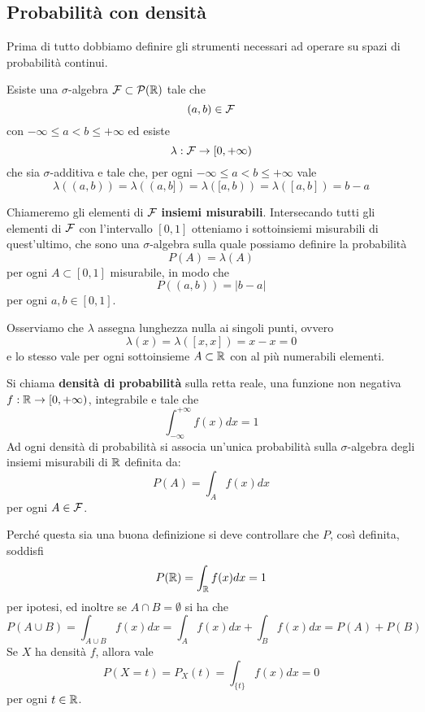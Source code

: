 \subsection{Probabilità con densità}
Prima di tutto dobbiamo definire gli strumenti necessari ad operare su spazi di probabilità
continui.

\begin{theorem}
	Esiste una $\sigma$-algebra $\mathcal{F} \subset \mathcal{P}(\mathbb{R})$ tale che
	\[ (a, b) \in \mathcal{F} \]
	con $-\infty \leq a < b \leq +\infty$ ed esiste
	\[ \lambda : \mathcal{F} \to [0, +\infty) \]
			che sia $\sigma$-additiva e tale che, per ogni $-\infty \leq a < b \leq +\infty$ vale
			\[ \lambda((a,b)) = \lambda((a,b]) = \lambda ([a,b)) = \lambda([a,b]) = b - a \]
\end{theorem}

Chiameremo gli elementi di $\mathcal{F}$ \textbf{insiemi misurabili}. Intersecando tutti gli elementi di
$\mathcal{F}$ con l'intervallo $[0,1]$ otteniamo i sottoinsiemi misurabili di quest'ultimo, che sono una
$\sigma$-algebra sulla quale possiamo definire la probabilità
\[ P (A) = \lambda (A) \]
per ogni $A \subset [0,1]$ misurabile, in modo che
\[ P((a, b)) = |b - a| \]
per ogni $a,b \in [0,1]$.

\begin{observation}
	Osserviamo che $\lambda$ assegna lunghezza nulla ai singoli punti, ovvero
	\[ \lambda(x) = \lambda([x,x]) = x - x = 0 \]
	e lo stesso vale per ogni sottoinsieme $A \subset \mathbb{R}$ con al più numerabili elementi.
\end{observation}

\begin{definition}
	Si chiama \textbf{densità di probabilità} sulla retta reale, una funzione non negativa
	$f : \mathbb{R} \to [0, +\infty)$, integrabile e tale che
	\[ \int_{-\infty}^{+\infty} f(x) dx = 1 \]
	Ad ogni densità di probabilità si associa un'unica probabilità sulla $\sigma$-algebra degli
	insiemi misurabili di $\mathbb{R}$ definita da:
	\[ P(A) = \int_A f(x) dx \]
	per ogni $A \in \mathcal{F}$.
\end{definition}

Perché questa sia una buona definizione si deve controllare che $P$, così definita, soddisfi
\[ P(\mathbb{R}) = \int_{\mathbb{R}} f(x) dx = 1 \]
per ipotesi, ed inoltre se $A \cap B = \emptyset$ si ha che
\[ P(A \cup B) = \int_{A \cup B} f(x) dx = \int_A f(x) dx + \int_B f(x) dx = P(A) + P(B) \]
Se $X$ ha densità $f$, allora vale
\[ P(X = t) = P_X (t) = \int_{\{t\}} f(x) dx = 0 \]
per ogni $t \in \mathbb{R}$.